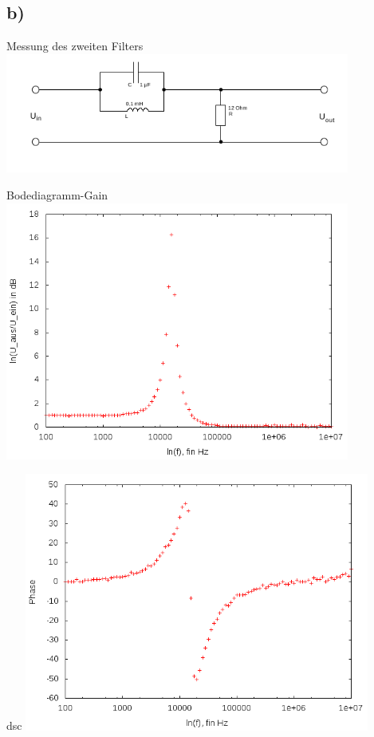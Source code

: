 \documentclass[compress,11pt]{beamer}
\begin{document}
\subsection{b)}
\begin{frame}
\begin{block}{Messung des zweiten Filters}
\includegraphics[width=0.85\textwidth]{../daten/Messdaten/plots/schalt_4b}
\end{block}
\end{frame}
\begin{frame}
\begin{block}{Bodediagramm-Gain}
\includegraphics[width=0.85\textwidth]{../daten/Messdaten/plots/Aufgabe4bschaltung2}

\end{block}
\end{frame}



\begin{frame}
\begin{block}{dsc}
\includegraphics[width=0.85\textwidth]{../daten/Messdaten/plots/Aufgabe4bschaltung2_lin_phase}

\end{block}
\end{frame}
\end{document}
